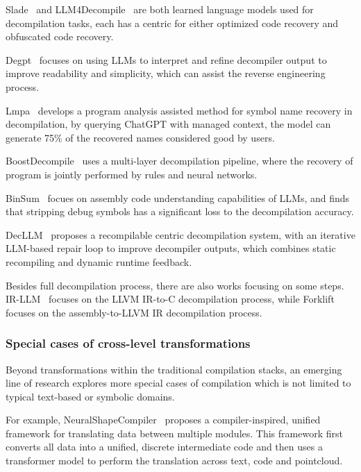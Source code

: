 \documentclass[pdflatex,sn-mathphys-ay,twocolumn, a4paper]{sn-jnl}%
\theoremstyle{thmstyleone}%
\theoremstyle{thmstyletwo}%
\theoremstyle{thmstylethree}%
\begin{document}
Slade~\citep{72_armengol2024slade} and LLM4Decompile~\citep{73_tan-etal-2024-llm4decompile} are both learned language models used for decompilation tasks, each has a centric for either optimized code recovery and obfuscated code recovery.

Degpt~\citep{75_hu2024degpt} focuses on using LLMs to interpret and refine decompiler output to improve readability and simplicity, which can assist the reverse engineering process.

Lmpa~\citep{130_xu2023lmpa} develops a program analysis assisted method for symbol name recovery in decompilation, by querying ChatGPT with managed context, the model can generate 75\% of the recovered names considered good by users.

BoostDecompile~\citep{155_cao2022boosting} uses a multi-layer decompilation pipeline, where the recovery of program is jointly performed by rules and neural networks.

BinSum~\citep{129_binsum2023_arxiv} focues on assembly code understanding capabilities of LLMs, and finds that stripping debug symbols has a significant loss to the decompilation accuracy.

DecLLM~\citep{173_wong2025decllm} proposes a recompilable centric decompilation system, with an iterative LLM-based repair loop to improve decompiler outputs, which combines static recompiling and dynamic runtime feedback.

Besides full decompilation process, there are also works focusing on some steps. 
IR-LLM~\citep{13_jiang2025can} focuses on the LLVM IR-to-C decompilation process, while Forklift~\citep{169_armengol-estape2024forklift} focuses on the assembly-to-LLVM IR decompilation process.


\subsubsection{Special cases of cross-level transformations}



Beyond transformations within the traditional compilation stacks, an emerging line of research explores more special cases of compilation which is not limited to typical text-based or symbolic domains. 

For example, NeuralShapeCompiler~\citep{145_luo2023neural} proposes a compiler-inspired, unified framework for translating data between multiple modules. This framework first converts all data into a unified, discrete intermediate code and then uses a transformer model to perform the translation across text, code and pointcloud.
\end{document}
